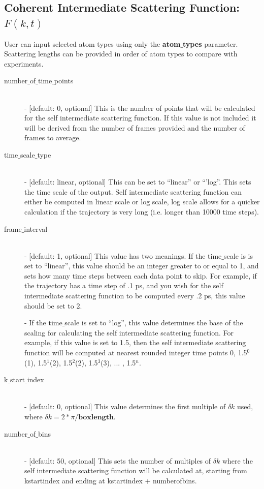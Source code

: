 \documentclass{article}
\begin{document}
\subsection{Coherent Intermediate Scattering Function: $F(k,t)$} \label{sec::Fqt_parm}
User can input selected atom types using only the \textbf{atom$\_$types} parameter. Scattering lengths can be provided in order of atom types to compare with experiments.
\begin{description}	
	\item[number$\_$of$\_$time$\_$points]\hfill \\
	- [default: 0, optional] This is the number of points that will be calculated for the self intermediate scattering function.  If this value is not included it will be derived from the number of frames provided and the number of frames to average.
	
	\item[time$\_$scale$\_$type] \hfill \\
	- [default: linear, optional] This can be set to ``linear'' or ``'log''.  This sets the time scale of the output. Self intermediate scattering function can either be computed in linear scale or log scale, log scale allows for a quicker calculation if the trajectory is very long (i.e. longer than 10000 time steps).
	
	\item[frame$\_$interval] \hfill \\
	- [default: 1, optional] This value has two meanings.  If the time$\_$scale is is set to ``linear'', this value should be an integer greater to or equal to 1, and sets how many time steps between each data point to skip.  For example, if the trajectory has a time step of .1 ps, and you wish for the self intermediate scattering function to be computed every .2 ps, this value should be set to 2. 
	
	- If the time$\_$scale is set to ``log'', this value determines the base of the scaling for calculating the self intermediate scattering function.  For example, if this value is set to 1.5, then the self intermediate scattering function will be computed at nearest rounded integer time points 0, 1.5$^0$(1), 1.5$^1$(2), 1.5$^2$(2), 1.5$^3$(3), ... , 1.5$^{n}$.
	
	\item[k$\_$start$\_$index] \hfill \\
	- [default: 0, optional] This value determines the first multiple of $\delta k$ used, where $\delta k = 2*\pi/\textbf{boxlength}$.  
	
	\item[number$\_$of$\_$bins] \hfill \\
	- [default: 50, optional] This sets the number of multiples of $\delta k$ where the self intermediate scattering function will be calculated at, starting from kstartindex and ending at kstartindex + numberofbins.
	
\end{description}
\end{document}
